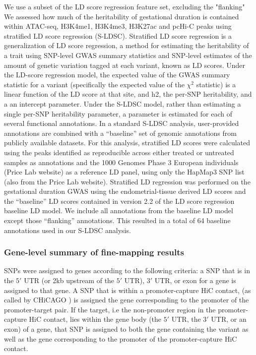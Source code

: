 We use a subset of the LD score regression feature set, excluding the "flanking"
We assessed how much of the heritability of  gestational duration is contained within ATAC-seq, H3K4me1, H3K4me3, H3K27ac and pcHi-C peaks using stratified LD score regression (S-LDSC).
Stratified LD score regression is a generalization of LD score regression, a method for estimating the heritability of a trait using SNP-level GWAS summary statistics and SNP-level estimates
 of the amount of genetic variation tagged at each variant, known as LD scores.  Under the LD-score regression model, the expected value of the GWAS summary statistic for a variant (specifically 
the expected value of the \(\chi^2\) statistic) is a linear function of the LD score at that site, and h2, the per-SNP heritability, and a an intercept parameter.  Under the S-LDSC model, rather than estimating a 
single per-SNP heritability parameter, a parameter is estimated for each of several functional annotations.  In a standard S-LDSC analysis, user-provided annotations are combined with a “baseline” set of genomic
 annotations from publicly available datasets.  For this analysis, stratified LD scores were calculated using the peaks identified as reproducible across either treated or untreated samples as annotations and the 
1000 Genomes Phase 3 European individuals (Price Lab website) as a reference LD panel, using only the HapMap3 SNP list (also from the Price Lab website). Stratified LD regression was performed on the gestational 
duration GWAS using the endometrial-tissue derived LD scores and the “baseline” LD scores contained in version 2.2 of the LD score regression baseline LD model. We include all annotations from the baseline LD model 
except those “flanking” annotations. This resulted in a total of 64 baseline annotations used in our S-LDSC analysis.  


\subsubsection{Gene-level summary of fine-mapping results}\label{sec:org3f48450}

SNPs were assigned to genes according to the following criteria:  a SNP that is in the \(5'\) UTR (or 2kb upstream of the \(5'\) UTR), \(3'\) UTR, or exon for a gene is assigned to that gene.
A SNP that is within a promoter-capture HiC contact, (as called by CHiCAGO \cite{chicago}) is assigned the gene corresponding to the promoter of the promoter-target pair.  If the target, i.e
the non-promoter region in the promoter-capture HiC contact, lies within the gene body (the \(5'\) UTR, the \(3'\) UTR, or an exon) of a gene, that SNP is assigned to both the gene containing the variant
as well as the gene corresponding to the promoter of the promoter-capture HiC contact.  


